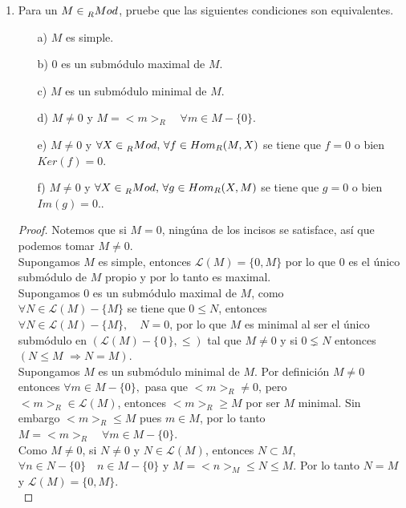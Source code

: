 \documentclass{article}
\newcommand{\La}{\mathscr{L}}
\theoremstyle{definition}
\theoremstyle{plain}
\theoremstyle{plain}
\theoremstyle{definition}
\theoremstyle{definition}
\theoremstyle{definition}
\theoremstyle{definition}
\theoremstyle{definition}
\theoremstyle{definition}
\begin{document}
\begin{enumerate}[label=\textbf{Ej \arabic*.}]
\item Para un $M\in \prescript{}{R}{Mod}$, pruebe que las siguientes condiciones son equivalentes.
\begin{itemize}
	\item[a)]  $M$ es simple.
	\item[b)]  $0$ es un submódulo maximal de $M$.
	\item[c)]  $M$ es un submódulo minimal de $M$.
	\item[d)]  $M\neq 0$ y $M=<m>_R\quad \forall m\in M-\{0\}$.
	\item[e)]  $M\neq 0$ y $\forall X\in \prescript{}{R}{Mod}, \,\forall f\in Hom_R(M,X)$ se tiene que $f=0$ o bien 
	$Ker(f)=0$.
	\item[f)]  $M\neq 0$ y $\forall X\in \prescript{}{R}{Mod}, \,\forall g\in Hom_R(X,M)$ se tiene que $g=0$ o bien 
	$Im(g)=0$..
\end{itemize}
\begin{proof}
	Notemos que si $M=0$, ningúna de los incisos se satisface, así que podemos tomar $M\neq 0$.\\
	
	 Supongamos $M$ es simple, entonces $\La(M)=\{0,M\}$ por lo que $0$ es el único
	submódulo de $M$ propio y por lo tanto es maximal.\\
	
	 Supongamos $0$ es un submódulo maximal de $M$, como \\ $\forall N\in \La(M)-\{M\}$ se tiene 
	que $0\leq  N$, entonces \\ $\forall N\in\La(M)-\{M\},\quad N=0$, por lo que $M$ es minimal al ser el único submódulo en 
	$\left(\La(M)-\{\,0\,\},\leq \right)$ tal que $M\neq 0$ y si $0\lneq N$ entonces \quad $\left(N\leq M\,\,\Rightarrow N=M\right)$.\\
	
	Supongamos $M$ es un submódulo minimal de $M$. Por definición $M\neq 0$ entonces 
	$\forall m\in M-\{0\},$ pasa que $<m>_R\neq 0$, pero \\
	$<m>_R\in \La(M)$, entonces $<m>_R\geq M$ por ser $M$ minimal.
	Sin embargo $<m>_R\leq M$ pues $m\in M$, por lo tanto $M=<m>_R\quad \forall m\in M-\{0\}$.\\
	
	 Como $M\neq 0$, si $N\neq 0$ y $N\in \La(M)$, entonces $N\subset M$,
	$\forall n\in N-\{0\}\quad n\in M-\{0\}$ y $M=<n>_M\leq N\leq M$. Por lo tanto $N=M$ y $\La(M)=\{0,M\}$.\\
	

\end{proof}
\end{enumerate}
\end{document}
